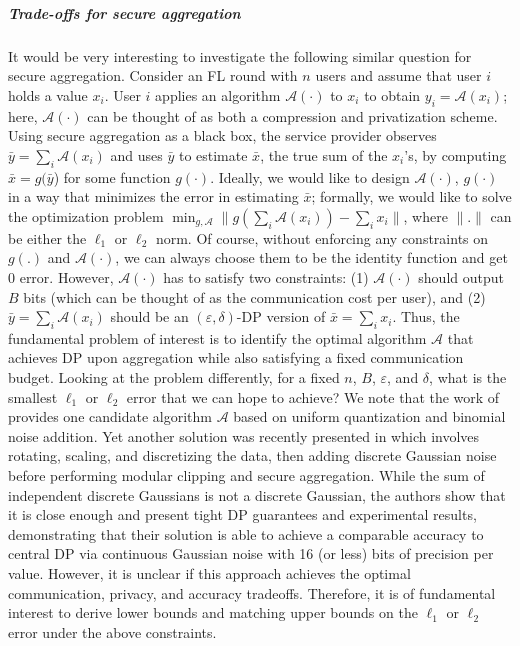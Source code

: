 \documentclass[11pt]{article}
\begin{document}
\subparagraph{Trade-offs for secure aggregation} It would be very interesting to investigate the following similar question for secure aggregation. Consider an FL round with $n$ users and assume that user $i$ holds a value $x_i$. User $i$ applies an algorithm $\mathcal{A}(\cdot)$ to $x_i$ to obtain $y_i = \mathcal{A}(x_i)$; here, $\mathcal{A}(\cdot)$ can be thought of as both a compression and privatization scheme. Using secure aggregation as a black box, the service provider observes $\bar{y} = \sum_i \mathcal{A}(x_i)$ and uses $\bar{y}$ to estimate $\bar{x}$, the true sum of the $x_i$'s, by computing $\hat{\bar{x}} = g(\bar{y}$) for some function $g(\cdot)$. Ideally, we would like to design $\mathcal{A}(\cdot)$, $g(\cdot)$ in a way that minimizes the error in estimating $\bar{x}$; formally, we would like to solve the optimization problem $\min_{g,\mathcal{A}} \|g(\sum_i \mathcal{A}(x_i)) - \sum_i x_i\|$, where $\|.\|$ can be either the $\ell_1$ or $\ell_2$ norm. Of course, without enforcing any constraints on $g(.)$ and $\mathcal{A}(\cdot)$, we can always choose them to be the identity function and get $0$ error. However, $\mathcal{A}(\cdot)$ has to satisfy two constraints: (1) $\mathcal{A}(\cdot)$ should output $B$ bits (which can be thought of as the communication cost per user), and (2) $\bar{y} = \sum_i \mathcal{A}(x_i)$ should be an $(\varepsilon, \delta)$-DP version of $\bar{x} = \sum_i x_i$. Thus, the fundamental problem of interest is to identify the optimal algorithm $\mathcal{A}$ that achieves DP upon aggregation while also satisfying a fixed communication budget. Looking at the problem differently, for a fixed $n$, $B$, $\varepsilon$, and $\delta$, what is the smallest $\ell_1$ or $\ell_2$ error that we can hope to achieve? We note that the work of \citet{agarwal2018cpsgd} provides one candidate algorithm $\mathcal{A}$ based on uniform quantization and binomial noise addition. Yet another solution was recently presented in \cite{kairouz2021distributed} which involves rotating, scaling, and discretizing the data, then adding discrete Gaussian noise before performing modular clipping and secure aggregation. While the sum of independent discrete Gaussians is not a discrete Gaussian, the authors show that it is close enough and present tight DP guarantees and experimental results, demonstrating that their solution is able to achieve a comparable accuracy to central DP via continuous Gaussian noise with 16 (or less) bits of precision per value. However, it is unclear if this approach achieves the optimal communication, privacy, and accuracy tradeoffs. Therefore, it is of fundamental interest to derive lower bounds and matching upper bounds on the $\ell_1$ or $\ell_2$ error under the above constraints.
\end{document}
